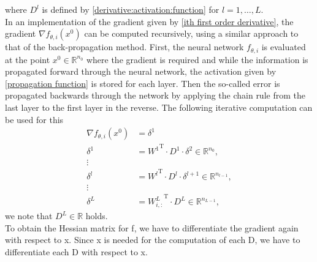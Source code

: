 where $D^l$ is defined by \cref{derivative:activation:function} for $l = 1, \ldots, L$. \\
In an implementation of the gradient given by \cref{ith first order derivative}, the gradient $\nabla f_{\theta, i} \left(x^0\right)$ can be computed recursively, using a similar approach to that of the back-propagation method. First, the neural network $f_{\theta, i}$ is evaluated at the point $x^0 \in \mathbb{R}^{n_0}$ where the gradient is required and while the information is propagated forward through the neural network, the activation given by \cref{propagation function} is stored for each layer. Then the so-called error is propagated backwards through the network by applying the chain rule from the last layer to the first layer in the reverse. The following iterative computation can be used for this
\begin{align*}
    \nabla f_{\theta, i} \left(x^0\right) & = \delta^1 \\
    \delta^1 & = {W^{1}}^{\mathrm{T}} \cdot D^{1} \cdot \delta^2 \in \mathbb{R}^{n_0}, \\
    \vdots & \\
    \delta^l & = {W^{l}}^{\mathrm{T}} \cdot D^{l} \cdot \delta^{l+1} \in \mathbb{R}^{n_{l-1}}, \\
    \vdots & \\
    \delta^{L} & = {W^L_{i,:}}^{\mathrm{T}} \cdot D^{L} \in \mathbb{R}^{n_{L-1}},
\end{align*}
we note that $D^{L} \in \mathbb{R}$ holds. \\
To obtain the Hessian matrix for f, we have to differentiate the gradient again with respect to x. Since x is needed for the computation of each D, we have to differentiate each D with respect to x. 





